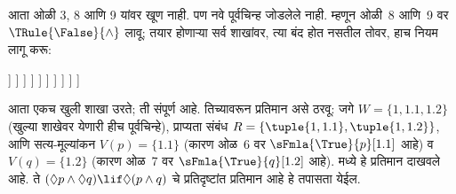 \documentclass[../../../include/open-logic-section]{subfiles}
\begin{document}
{\begin{ex}
  आता ओळी 3, 8 आणि 9 यांवर खूण नाही.
  पण नवे पूर्वचिन्ह जोडलेले नाही. म्हणून
  ओळी~8 आणि~9 वर
  $\TRule{\False}{\land}$ लावू; तयार होणाऱ्या
  सर्व शाखांवर, त्या बंद होत नसतील तोवर,
  हाच नियम लागू करू:
  \begin{oltableau}
    [\pFmla{\False}{(\Diamond p \land \Diamond q) \lif \Diamond(p \land q)}{1},
      just = \TAss, checked
      [\pFmla{\True}{\Diamond p \land \Diamond q}{1},
        just = {\TRule{\False}{\lif}[1]}, checked
        [\pFmla{\False}{\Diamond(p \land q)}{1},
          just = {\TRule{\False}{\lif}[1]}
          [\pFmla{\True}{\Diamond p}{1},
            just = {\TRule{\True}{\land}[2]}, checked
            [\pFmla{\True}{\Diamond q}{1},
              just = {\TRule{\True}{\land}[2]}, checked
              [\pFmla{\True}{p}{1.1},
                just = {\TRule{\True}{\Diamond}[4]}, checked
                [\pFmla{\True}{q}{1.2},
                  just = {\TRule{\True}{\Diamond}[5]}, checked
                  [\pFmla{\False}{p \land q}{1.1},
                    just = {\TRule{\False}{\Diamond}[3]}, checked
                    [\pFmla{\False}{p \land q}{1.2},
                      just = {\TRule{\False}{\Diamond}[3]}, checked
                      [\pFmla{\False}{p}{1.1},
                        just = {\TRule{\False}{\land}[8]}, checked, close
                      ]
                      [\pFmla{\False}{q}{1.1},
                        just = {\TRule{\False}{\land}[8]}, checked
                        [\pFmla{\False}{p}{1.2},
                          just = {\TRule{\False}{\land}[9]}, checked]
                        [\pFmla{\False}{q}{1.2},
                          just = {\TRule{\False}{\land}[9]}, checked, close]
                      ]
                    ]
                  ]
                ]
              ]
            ]
          ]
        ]
      ]
    ]
  \end{oltableau}
  आता एकच खुली शाखा उरते; ती संपूर्ण आहे.
  तिच्यावरून प्रतिमान असे ठरवू: जगे
  $W = \{1, 1.1, 1.2\}$ (खुल्या शाखेवर
  येणारी हीच पूर्वचिन्हे), प्राप्यता संबंध
  $R = \{\tuple{1, 1.1}, \tuple{1, 1.2}\}$,
  आणि सत्य-मूल्यांकन $V(p) = \{1.1\}$
  (कारण ओळ~6 वर
  $\sFmla{\True}{p}[1.1]$ आहे) व
  $V(q) = \{1.2\}$ (कारण ओळ~7 वर
  $\sFmla{\True}{q}[1.2]$ आहे).
   मध्ये हे प्रतिमान
  दाखवले आहे. ते $(\Diamond p \land \Diamond q)
  \lif \Diamond (p \land q)$ चे प्रतिदृष्टांत
  प्रतिमान आहे हे तपासता येईल.
  \begin{figure}
  \begin{center}
    \begin{tikzpicture}[modal]

\end{tikzpicture}
\end{center}
\end{figure}
\end{ex}}
\end{document}
